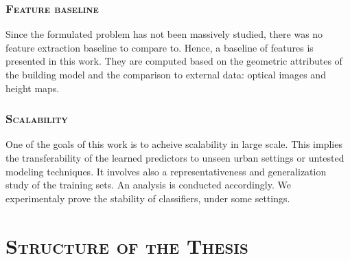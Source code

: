         \subsubsection{\textsc{Feature baseline}}
            Since the formulated problem has not been massively studied, there was no feature extraction baseline to compare to.
            Hence, a baseline of features is presented in this work.
            They are computed based on the geometric attributes of the building model and the comparison to external data: optical images and height maps.
        
        \subsubsection{\textsc{Scalability}}
            One of the goals of this work is to acheive scalability in large scale.
            This implies the transferability of the learned predictors to unseen urban settings or untested modeling techniques.
            It involves also a representativeness and generalization study of the training sets.
            An analysis is conducted accordingly.
            We experimentaly prove the stability of classifiers, under some settings.

\section{\textsc{Structure of the Thesis}}
    \label{sec::introduction::structure_of_thesis}
